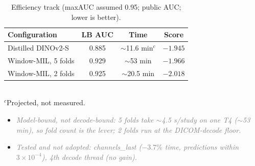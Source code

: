 \documentclass[conference]{IEEEtran}
\newcommand{\nt}[1]{\textcolor{gray}{\textit{#1}}}            %
\begin{document}
\begin{table}[t]
\caption{Efficiency track (maxAUC assumed 0.95; public AUC; lower is better).}
\label{tab:eff}
\centering\footnotesize
\begin{tabular}{@{}lccc@{}}
\toprule
Configuration & LB AUC & Time & Score \\
\midrule
Distilled DINOv2-S & 0.885 & $\sim$11.6 min$^{c}$ & $-1.945$ \\  %
Window-MIL, 5 folds & 0.929 & $\sim$53 min & $-1.966$ \\             %
Window-MIL, 2 folds & 0.925 & $\sim$20.5 min & $\mathbf{-2.018}$ \\   %
\bottomrule
\end{tabular}\\[2pt]
{\footnotesize $^{c}$Projected, not measured.}
\end{table}
\begin{notes}
\begin{itemize}
\item \nt{Model-bound, not decode-bound: 5 folds take $\sim$4.5 s/study on one T4 ($\sim$53 min), so fold count is the lever;
2 folds run at the DICOM-decode floor.}  %
\item \nt{Tested and not adopted: channels\_last ($-3.7\%$ time, predictions within $3\times10^{-4}$), 4th decode thread (no gain).}
\end{itemize}
\end{notes}

\end{document}
